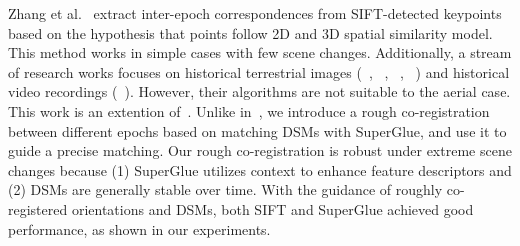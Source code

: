 Zhang et al.~\cite{zhang2020guided} extract inter-epoch correspondences from SIFT-detected keypoints based on the hypothesis that points follow 2D and 3D spatial similarity model. This method works in simple cases with few scene changes. {Additionally, a stream of research works focuses on historical terrestrial images (~\cite{maiwald2021automatic}, ~\cite{beltrami20193d}, ~\cite{bevilacqua2019reconstruction}, ~\cite{maiwald2019generation}) and historical video recordings (~\cite{maiwald2019generation}). However, their algorithms are not suitable to the aerial case.}\\
This work is an extention of~\cite{zhang2020guided}. Unlike in~\cite{zhang2020guided}, we introduce a rough co-registration between different epochs based on matching DSMs with SuperGlue, and use it to guide a precise matching. Our rough co-registration is robust under extreme scene changes because (1) SuperGlue utilizes context to enhance feature descriptors and (2) DSMs are generally stable over time. With the guidance of roughly co-registered orientations and DSMs, both SIFT and SuperGlue achieved good performance, as shown in our experiments.
